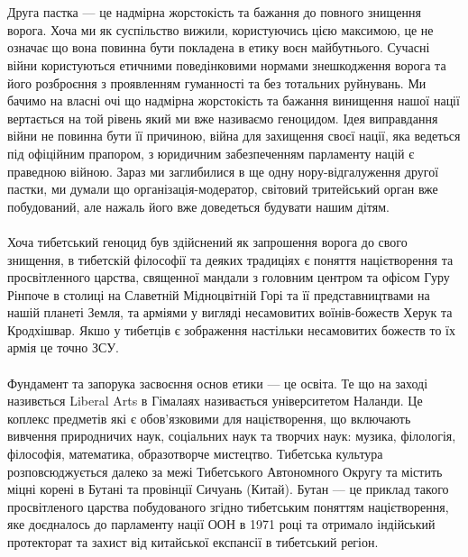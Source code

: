 \\
\\
Друга пастка — це надмірна жорстокість та бажання до повного знищення ворога. Хоча ми як суспільство вижили, користуючись цією максимою, це не означає що вона повинна бути покладена в етику воєн майбутнього. Сучасні війни користуються етичними поведінковими нормами знешкодження ворога та його розброєння з проявленням гуманності та без тотальних руйнувань. Ми бачимо на власні очі що надмірна жорстокість та бажання винищення нашої нації вертається на той рівень який ми вже називаємо геноцидом. Ідея виправдання війни не повинна бути її причиною, війна для захищення своєї нації, яка ведеться під офіційним прапором, з юридичним забезпеченням парламенту націй є праведною війною. Зараз ми заглибилися в ще одну нору-відгалуження другої пастки, ми думали що організація-модератор, світовий тритейський орган вже побудований, але нажаль його вже доведеться будувати нашим дітям.
\\
\\
Хоча тибетський геноцид був здійснений як запрошення ворога до свого знищення, в тибетскій філософії та деяких традиціях є поняття націєтворення та просвітленного царства, священної мандали з головним центром та офісом Гуру Рінпоче в столиці на Славетній Мідноцвітній Горі та її представництвами на нашій планеті Земля, та арміями у вигляді несамовитих воїнів-божеств Херук та Кродхішвар. Якшо у тибетців є зображення настільки несамовитих божеств то їх армія це точно ЗСУ.
\\
\\
Фундамент та запорука засвоєння основ етики — це освіта. Те що на заході називється Liberal Arts в Гімалаях називається університетом Наланди. Це коплекс предметів які є обов'язковими для націєтворення, що включають вивчення природничих наук, соціальних наук та творчих наук: музика, філологія, філософія, математика, образотворче мистецтво. Тибетська культура розповсюджується далеко за межі Тибетського Автономного Округу та містить міцні корені в Бутані та провінції Сичуань (Китай). Бутан — це приклад такого просвітленого царства побудованого згідно тибетським поняттям націєтворення, яке доєдналось до парламенту нації ООН в 1971 році та отримало індійський протекторат та захист від китайської експансії в тибетський регіон.
\\
\\
